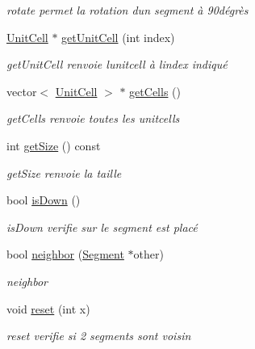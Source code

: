 \begin{DoxyCompactItemize}
\begin{DoxyCompactList}\small\item\em rotate permet la rotation d\textquotesingle{}un segment à 90dégrès \end{DoxyCompactList}\item 
\hyperlink{class_unit_cell}{Unit\+Cell} $\ast$ \hyperlink{class_segment_a4c02741758eaae91a7e5fe04ea33aa17}{get\+Unit\+Cell} (int index)
\begin{DoxyCompactList}\small\item\em get\+Unit\+Cell renvoie l\textquotesingle{}unitcell à l\textquotesingle{}index indiqué \end{DoxyCompactList}\item 
vector$<$ \hyperlink{class_unit_cell}{Unit\+Cell} $>$ $\ast$ \hyperlink{class_segment_a65060dd0d9d490054056869caea68a44}{get\+Cells} ()
\begin{DoxyCompactList}\small\item\em get\+Cells renvoie toutes les unitcells \end{DoxyCompactList}\item 
int \hyperlink{class_segment_a96c4597d9f2265ca8a11604562627888}{get\+Size} () const 
\begin{DoxyCompactList}\small\item\em get\+Size renvoie la taille \end{DoxyCompactList}\item 
bool \hyperlink{class_segment_a85de0a9a7b0e1bb9e7397b147a19f959}{is\+Down} ()
\begin{DoxyCompactList}\small\item\em is\+Down verifie sur le segment est placé \end{DoxyCompactList}\item 
bool \hyperlink{class_segment_af810a0fcfc2a5e412237777433906eba}{neighbor} (\hyperlink{class_segment}{Segment} $\ast$other)
\begin{DoxyCompactList}\small\item\em neighbor \end{DoxyCompactList}\item 
void \hyperlink{class_segment_ab51341d5b76009abb2ac69f870fb2633}{reset} (int x)
\begin{DoxyCompactList}\small\item\em reset verifie si 2 segments sont voisin \end{DoxyCompactList}\end{DoxyCompactItemize}
